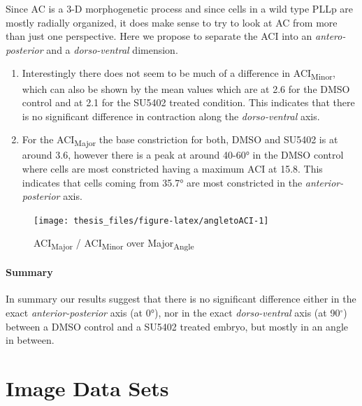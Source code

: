 \documentclass[11pt,singlespacinge,twoside]{reedthesis} %
\begin{document}
\noindent Since AC is a 3-D morphogenetic process and since cells in a wild type PLLp are mostly radially organized, it does make sense to try to look at AC from more than just one perspective. Here we propose to separate the ACI into an \emph{antero-posterior} and a \emph{dorso-ventral} dimension.
\begin{enumerate}
\def\labelenumi{\arabic{enumi}.}
\item
  Interestingly there does not seem to be much of a difference in ACI\textsubscript{Minor}, which can also be shown by the mean values which are at 2.6 for the DMSO control and at 2.1 for the SU5402 treated condition. This indicates that there is no significant difference in contraction along the \emph{dorso-ventral} axis.
\item
  For the ACI\textsubscript{Major} the base constriction for both, DMSO and SU5402 is at around 3.6, however there is a peak at around 40-60° in the DMSO control where cells are most constricted having a maximum ACI at 15.8. This indicates that cells coming from 35.7° are most constricted in the \emph{anterior-posterior} axis.
\end{enumerate}

\begin{figure}

{\centering \texttt{[image: thesis\_files/figure-latex/angletoACI-1]} 

}

\caption{ACI\textsubscript{Major} / ACI\textsubscript{Minor} over Major\textsubscript{Angle}}\label{fig:angletoACI}
\end{figure}
\hypertarget{summary-3}{%
\paragraph{Summary}\label{summary-3}}

In summary our results suggest that there is no significant difference either in the exact \emph{anterior-posterior} axis (at 0°), nor in the exact \emph{dorso-ventral} axis (at 90\(^\circ\)) between a DMSO control and a SU5402 treated embryo, but mostly in an angle in between.

\hypertarget{mat-datasets}{%
\section{Image Data Sets}\label{mat-datasets}}
\end{document}
